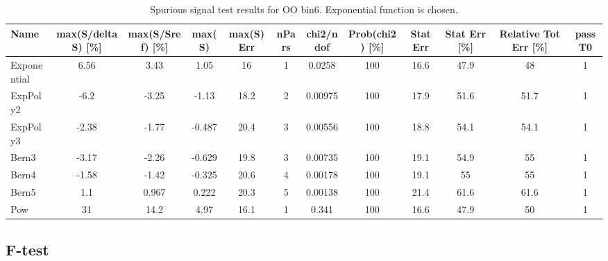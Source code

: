\begin{landscape}
\begin{table}[]
\footnotesize
\begin{tabular}{l|ccccccccccc}
Name        & max(S/deltaS) {[}\%{]} & max(S/Sref) {[}\%{]} & max(S) & max(S) Err & nPars & chi2/ndof & Prob(chi2) {[}\%{]} & Stat Err & Stat Err {[}\%{]} & Relative Tot Err {[}\%{]} & passT0 \\ \hline
Exponential & 6.56                   & 3.43                 & 1.05   & 16         & 1     & 0.0258    & 100                 & 16.6     & 47.9              & 48                        & 1      \\
ExpPoly2    & -6.2                   & -3.25                & -1.13  & 18.2       & 2     & 0.00975   & 100                 & 17.9     & 51.6              & 51.7                      & 1      \\
ExpPoly3    & -2.38                  & -1.77                & -0.487 & 20.4       & 3     & 0.00556   & 100                 & 18.8     & 54.1              & 54.1                      & 1      \\
Bern3       & -3.17                  & -2.26                & -0.629 & 19.8       & 3     & 0.00735   & 100                 & 19.1     & 54.9              & 55                        & 1      \\
Bern4       & -1.58                  & -1.42                & -0.325 & 20.6       & 4     & 0.00178   & 100                 & 19.1     & 55                & 55                        & 1      \\
Bern5       & 1.1                    & 0.967                & 0.222  & 20.3       & 5     & 0.00138   & 100                 & 21.4     & 61.6              & 61.6                      & 1      \\
Pow         & 31                     & 14.2                 & 4.97   & 16.1       & 1     & 0.341     & 100                 & 16.6     & 47.9              & 50                        & 1      \\
\end{tabular}
\caption{Spurious signal test results for OO bin6. Exponential function is chosen.}
\label{tab:SSbin6}
\end{table}

\end{landscape}




\subsection{F-test}
\label{subsec:Ftest}

